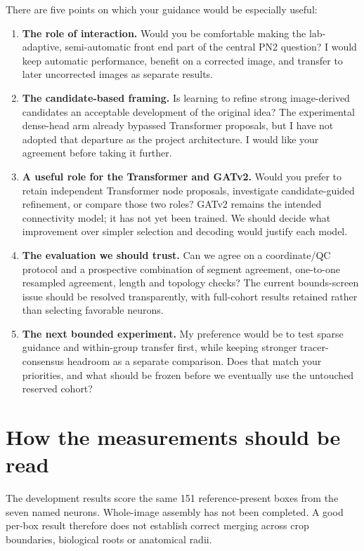 \documentclass[11pt,a4paper]{article}
\begin{document}
There are five points on which your guidance would be especially useful:
\begin{enumerate}
\item \textbf{The role of interaction.} Would you be comfortable making the lab-adaptive, semi-automatic front end part of the central PN2 question? I would keep automatic performance, benefit on a corrected image, and transfer to later uncorrected images as separate results.
\item \textbf{The candidate-based framing.} Is learning to refine strong image-derived candidates an acceptable development of the original idea? The experimental dense-head arm already bypassed Transformer proposals, but I have not adopted that departure as the project architecture. I would like your agreement before taking it further.
\item \textbf{A useful role for the Transformer and GATv2.} Would you prefer to retain independent Transformer node proposals, investigate candidate-guided refinement, or compare those two roles? GATv2 remains the intended connectivity model; it has not yet been trained. We should decide what improvement over simpler selection and decoding would justify each model.
\item \textbf{The evaluation we should trust.} Can we agree on a coordinate/QC protocol and a prospective combination of segment agreement, one-to-one resampled agreement, length and topology checks? The current bounds-screen issue should be resolved transparently, with full-cohort results retained rather than selecting favorable neurons.
\item \textbf{The next bounded experiment.} My preference would be to test sparse guidance and within-group transfer first, while keeping stronger tracer-consensus headroom as a separate comparison. Does that match your priorities, and what should be frozen before we eventually use the untouched reserved cohort?
\end{enumerate}

\clearpage
\appendix
\section{How the measurements should be read}
\label{app:metrics}
The development results score the same 151 reference-present boxes from the seven named neurons. Whole-image assembly has not been completed. A good per-box result therefore does not establish correct merging across crop boundaries, biological roots or anatomical radii.
\end{document}
